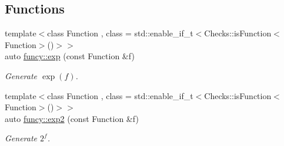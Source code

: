 \subsection*{Functions}
\begin{DoxyCompactItemize}
\item 
{\footnotesize template$<$class Function , class  = std\-::enable\-\_\-if\-\_\-t$<$\-Checks\-::is\-Function$<$\-Function$>$()$>$$>$ }\\auto \hyperlink{group__CMathGroup_gaadc968931c4efe760c812f6b871a97f5}{funcy\-::exp} (const Function \&f)
\begin{DoxyCompactList}\small\item\em Generate $ \exp(f) $. \end{DoxyCompactList}\item 
{\footnotesize template$<$class Function , class  = std\-::enable\-\_\-if\-\_\-t$<$\-Checks\-::is\-Function$<$\-Function$>$()$>$$>$ }\\auto \hyperlink{group__CMathGroup_gac880c86664b1237622566adea8f808a0}{funcy\-::exp2} (const Function \&f)
\begin{DoxyCompactList}\small\item\em Generate $2^f$. \end{DoxyCompactList}\end{DoxyCompactItemize}
